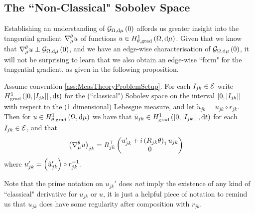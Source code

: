 \subsection{The ``Non-Classical" Sobolev Space} \label{appS:SobSpacesTheory}
Establishing an understanding of $\mathcal{G}_{ \Omega, \mathrm{d}\mu}\left( 0 \right)$  affords us greater insight into the tangential gradient $\nabla^{\theta}_\mu u$ of functions $u\in H^1_{\theta, \mathrm{grad}}\left( \Omega, \mathrm{d}\mu \right)$.
Given that we know that $\nabla^{\theta}_\mu u \perp \mathcal{G}_{ \Omega, \mathrm{d}\mu}\left( 0 \right)$, and we have an edge-wise characterisation of $\mathcal{G}_{ \Omega, \mathrm{d}\mu}\left( 0 \right)$, it will not be surprising to learn that we also obtain an edge-wise ``form" for the tangential gradient, as given in the following proposition.
\begin{prop} \label{prop:GraphTangGrad}
	Assume convention \ref{ass:MeasTheoryProblemSetup}.
	For each $I_{jk}\in \mathcal{E}$ write $H^1_\mathrm{grad}\left( \left[ 0,\left\lvert I_{jk} \right\rvert \right], \mathrm{d}t \right)$ for the (``classical") Sobolev space on the interval $\left[ 0,\left\lvert I_{jk} \right\rvert \right]$ with respect to the (1 dimensional) Lebesgue measure, and let $\tilde{u}_{jk} = u_{jk} \circ r_{jk}$.
	Then for $u\in H^1_{\theta, \mathrm{grad}}\left( \Omega, \mathrm{d}\mu \right)$ we have that $\tilde{u}_{jk}\in H^1_\mathrm{grad}\left( \left[ 0,\left\lvert I_{jk} \right\rvert \right], \mathrm{d}t \right)$ for each $I_{jk}\in \mathcal{E}$, and that
	\begin{align*}
		\left(  \nabla^{\theta}_\mu u  \right)_{jk} 
		&= R_{jk}^\top \begin{pmatrix} u_{jk}' + i\left( R_{jk}\theta \right)_1 u_{jk} \\ 0	\end{pmatrix}
	\end{align*}
	where $u_{jk}' = \left(  \tilde{u}_{jk}'  \right) \circ r_{jk}^{-1}$.
\end{prop}
Note that the prime notation on $u_{jk}'$ does \emph{not} imply the existence of any kind of ``classical" derivative for $u_{jk}$ or $u$, it is just a helpful piece of notation to remind us that $u_{jk}$ does have some regularity after composition with $r_{jk}$.
